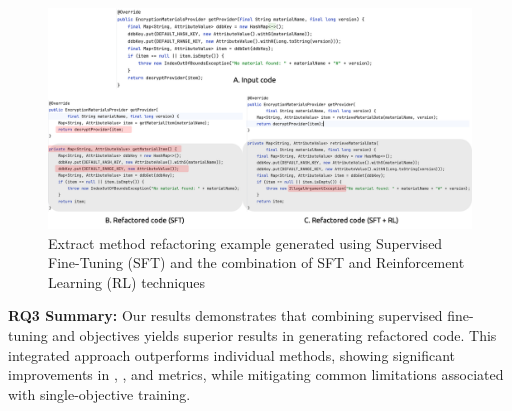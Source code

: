 \begin{figure}[ht!]
    \centering
    \includegraphics[width=\textwidth]{chapters/generation/images/example.png}
    \caption{Extract method refactoring example generated using Supervised Fine-Tuning (SFT) and the combination of SFT and Reinforcement Learning (RL) techniques}
    \label{fig:example}
\end{figure}

\begin{boxH}
    \textbf{RQ3 Summary:} Our results demonstrates that combining supervised fine-tuning and \rl{} objectives yields superior results in generating refactored code. This integrated approach outperforms individual methods, showing significant improvements in \codebleu{}, \bleu{}, and \rouge{} metrics, while mitigating common limitations associated with single-objective training.
\end{boxH}
